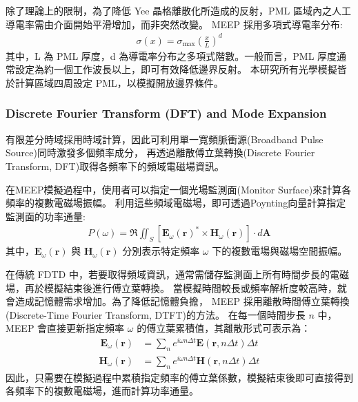 除了理論上的限制，為了降低 Yee 晶格離散化所造成的反射，PML 區域內之人工導電率需由介面開始平滑增加，而非突然改變。
MEEP 採用多項式導電率分布:
\begin{align}
\sigma(x) = \sigma_{\max} \left( \frac{x}{L} \right)^d
\label{eq:pml_profile}
\end{align}
其中，L 為 PML 厚度，d 為導電率分布之多項式階數。一般而言，PML 厚度通常設定為約一個工作波長以上，即可有效降低邊界反射。
本研究所有光學模擬皆於計算區域四周設定 PML，以模擬開放邊界條件。

\subsubsection{Discrete Fourier Transform (DFT) and Mode Expansion}

有限差分時域採用時域計算，因此可利用單一寬頻脈衝源(Broadband Pulse Source)同時激發多個頻率成分，
再透過離散傅立葉轉換(Discrete Fourier Transform, DFT)取得各頻率下的頻域電磁場資訊。

在MEEP模擬過程中，使用者可以指定一個光場監測面(Monitor Surface)來計算各頻率的複數電磁場振幅。
利用這些頻域電磁場，即可透過Poynting向量計算指定監測面的功率通量:
\begin{align}
P(\omega) = \Re \iint_{S} \left[ \mathbf{E}_{\omega}(\mathbf{r})^* \times \mathbf{H}_{\omega}(\mathbf{r}) \right] \cdot d\mathbf{A}
\label{eq:poynting_flux}
\end{align}
其中，$\mathbf{E}_{\omega}(\mathbf{r})$ 與 $\mathbf{H}_{\omega}(\mathbf{r})$
分別表示特定頻率 $\omega$ 下的複數電場與磁場空間振幅。

在傳統 FDTD 中，若要取得頻域資訊，通常需儲存監測面上所有時間步長的電磁場，再於模擬結束後進行傅立葉轉換。
當模擬時間較長或頻率解析度較高時，就會造成記憶體需求增加。為了降低記憶體負擔，
MEEP 採用離散時間傅立葉轉換(Discrete-Time Fourier Transform, DTFT)的方法。
在每一個時間步長 $n$ 中，MEEP 會直接更新指定頻率 $\omega$ 的傅立葉累積值，其離散形式可表示為：
\begin{align}
\mathbf{E}_{\omega}(\mathbf{r}) &= \sum_{n} e^{i \omega n \Delta t} \mathbf{E}(\mathbf{r}, n \Delta t) \Delta t 
\label{eq:dtft_e}
\end{align}
\begin{align}
\mathbf{H}_{\omega}(\mathbf{r}) &= \sum_{n} e^{i \omega n \Delta t} \mathbf{H}(\mathbf{r}, n \Delta t) \Delta t 
\label{eq:dtft_h}
\end{align}
因此，只需要在模擬過程中累積指定頻率的傅立葉係數，模擬結束後即可直接得到各頻率下的複數電磁場，進而計算功率通量。

